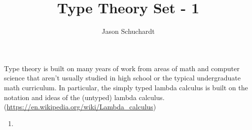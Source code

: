 \documentclass{article}
\title{Type Theory Set - 1}
\author{Jason Schuchardt}
\begin{document}
\maketitle

Type theory is built on many years of work from areas of math
and computer science
that aren't usually studied in high school or the typical
undergraduate math curriculum. In particular, the simply typed 
lambda calculus is built on the notation and ideas of the
(untyped) lambda calculus.
(\url{https://en.wikipedia.org/wiki/Lambda_calculus})

\begin{definition}
\end{definition}

\begin{enumerate}[(1)]
    \item 
\end{enumerate}
\end{document}
